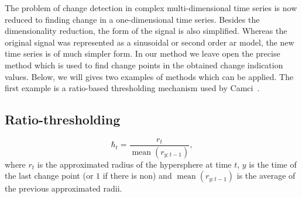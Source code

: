 The problem of change detection in complex multi-dimensional time series is now reduced to finding change in a one-dimensional time series.
Besides the dimensionality reduction, the form of the signal is also simplified.
Whereas the original signal was represented as a sinusoidal or second order \gls{ar} model, the new time series is of much simpler form.
In our method we leave open the precise method which is used to find change points in the obtained change indication values.
Below, we will gives two examples of methods which can be applied.
The first example is a ratio-based thresholding mechanism used by Camci~\cite{camci2010change}.

\subsection{Ratio-thresholding}

\begin{equation}\label{eq:ratio_radius}
  \hbar_t = \frac{r_t}{\operatorname*{mean}(r_{y:t-1})},
\end{equation}
where $r_t$ is the approximated radius of the hypersphere at time $t$, $y$ is the time of the last change point (or $1$ if there is non) and $\operatorname*{mean}(r_{y:t-1})$ is the average of the previous approximated radii.